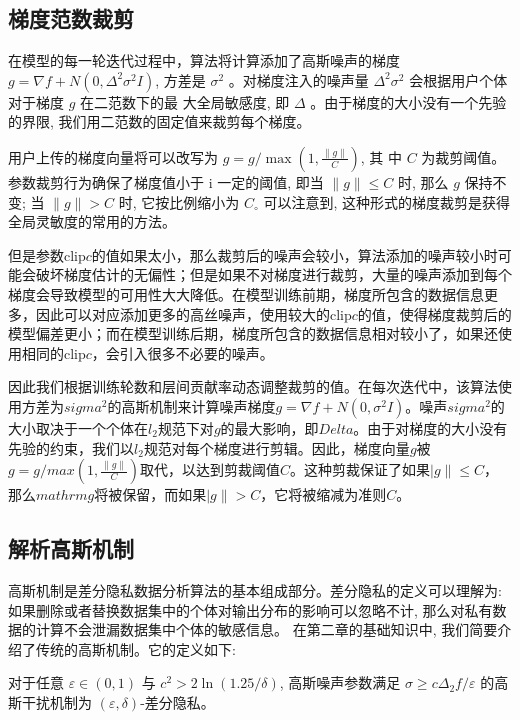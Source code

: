 \subsection{梯度范数裁剪}
在模型的每一轮迭代过程中，算法将计算添加了高斯噪声的梯度$g=\nabla f+N\left(0, \Delta^{2} \sigma^{2} I\right)$, 方差是 $\sigma^{2}$ 。对梯度注入的噪声量 $\Delta^{2} \sigma^{2}$ 会根据用户个体对于梯度 $g$ 在二范数下的最 大全局敏感度, 即 $\Delta$ 。由于梯度的大小没有一个先验的界限, 我们用二范数的固定值来裁剪每个梯度。

用户上传的梯度向量将可以改写为 $g=g / \max \left(1, \frac{\|g\|}{C}\right)$, 其 中 $C$ 为裁剪阈值。参数裁剪行为确保了梯度值小于 $\mathrm{i}$ 一定的阈值, 即当 $\|g\| \leq C$ 时, 那么 $g$ 保持不变; 当 $\|g\|>C$ 时, 它按比例缩小为 $C_{\circ}$ 可以注意到, 这种形式的梯度裁剪是获得全局灵敏度的常用的方法。

但是参数clip$c$的值如果太小，那么裁剪后的噪声会较小，算法添加的噪声较小时可能会破坏梯度估计的无偏性；但是如果不对梯度进行裁剪，大量的噪声添加到每个梯度会导致模型的可用性大大降低。在模型训练前期，梯度所包含的数据信息更多，因此可以对应添加更多的高丝噪声，使用较大的clip$c$的值，使得梯度裁剪后的模型偏差更小；而在模型训练后期，梯度所包含的数据信息相对较小了，如果还使用相同的clip$c$，会引入很多不必要的噪声。

因此我们根据训练轮数和层间贡献率动态调整裁剪的值。在每次迭代中，该算法使用方差为$sigma^{2}$的高斯机制来计算噪声梯度$g=\nabla f+N\left(0, \sigma^{2} I\right)$。噪声$sigma^{2}$的大小取决于一个个体在$l_{2}$规范下对$g$的最大影响，即$Delta$。由于对梯度的大小没有先验的约束，我们以$l_{2}$规范对每个梯度进行剪辑。因此，梯度向量$g$被$g=g/max \left(1, \frac{\|g\|}{C}\right)$取代，以达到剪裁阈值$C$。这种剪裁保证了如果$|g\| \leq C$，那么$mathrm{g}$将被保留，而如果$|g\|>C$，它将被缩减为准则$C$。

\subsection{解析高斯机制}
高斯机制是差分隐私数据分析算法的基本组成部分。差分隐私的定义可以理解为: 如果删除或者替换数据集中的个体对输出分布的影响可以忽略不计, 那么对私有数据的计算不会泄漏数据集中个体的敏感信息。
在第二章的基础知识中, 我们简要介绍了传统的高斯机制。它的定义如下: 
\begin{define}\label{差分隐私高斯机制}
对于任意 $\varepsilon \in(0,1)$ 与 $c^{2}>2 \ln (1.25 / \delta)$, 高斯噪声参数满足 $\sigma \geq c \Delta_{2} f / \varepsilon$ 的高斯干扰机制为 $(\varepsilon, \delta)$-差分隐私。
\end{define}

